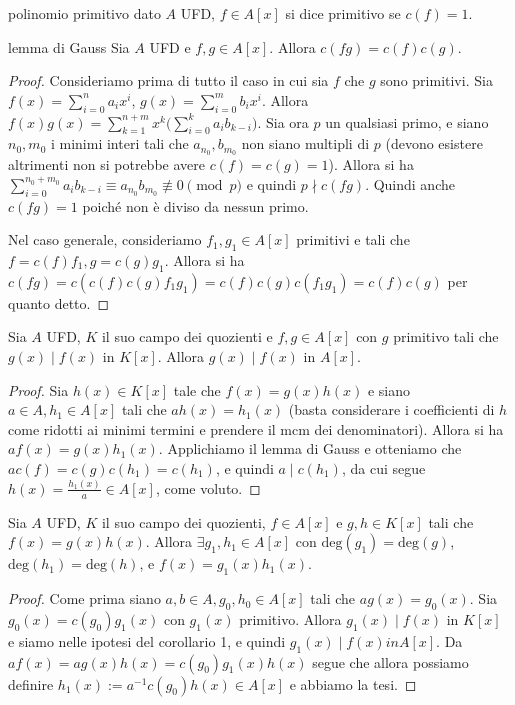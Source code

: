 \begin{definition}{polinomio primitivo}
    dato $A$ UFD, $f  \in A[x]$ si dice primitivo se $c(f) = 1$.
\end{definition}
\begin{theorem}{lemma di Gauss}
    Sia $A$ UFD e $f,g \in A[x]$. Allora $c(fg) = c(f)c(g)$.
\end{theorem}
\begin{proof}
    Consideriamo prima di tutto il caso in cui sia $f$ che $g$ sono primitivi. Sia $f(x) = \sum_{i=0}^n a_i x^i$, $g(x) = \sum_{i=0}^m b_ix^i$. Allora $f(x)g(x) = \sum_{k=1}^{n+m} x^k\big( \sum_{i = 0}^k a_ib_{k-i} \big)$. Sia ora $p$ un qualsiasi primo, e siano $n_0,m_0$ i minimi interi tali che $a_{n_0}, b_{m_0}$ non siano multipli di $p$ (devono esistere altrimenti non si potrebbe avere $c(f)= c(g) = 1$). Allora si ha $\sum_{i = 0}^{n_0+m_0} a_ib_{k-i} \equiv a_{n_0}b_{m_0} \not \equiv 0 \pmod{p}$ e quindi $p \nmid c(fg)$. Quindi anche $c(fg)=1$ poiché non è diviso da nessun primo.
    
    Nel caso generale, consideriamo $f_1, g_1 \in A[x]$ primitivi e tali che $f = c(f)f_1, g = c(g)g_1$. Allora si ha $c(fg) = c(c(f)c(g)f_1g_1) = c(f)c(g)c(f_1g_1) = c(f)c(g)$ per quanto detto.
\end{proof}
\begin{corollary}{1}
    Sia $A$ UFD, $K$ il suo campo dei quozienti e $f,g \in A[x]$ con $g$ primitivo tali che $g(x) \mid f(x)$ in $K[x]$. Allora $g(x) \mid f(x)$ in $A[x]$.
\end{corollary}
\begin{proof}
    Sia $h(x) \in K[x]$ tale che $f(x) = g(x)h(x)$ e siano $a \in A, h_1 \in A[x]$ tali che $ah(x) = h_1(x)$ (basta considerare i coefficienti di $h$ come ridotti ai minimi termini e prendere il mcm dei denominatori). Allora si ha $af(x) = g(x)h_1(x)$. Applichiamo il lemma di Gauss e otteniamo che $ac(f) = c(g)c(h_1) = c(h_1)$, e quindi $a \mid c(h_1)$, da cui segue $h(x) = \frac{h_1(x)}{a} \in A[x]$, come voluto.
\end{proof}
\begin{corollary}{2}
    Sia $A$ UFD, $K$ il suo campo dei quozienti, $f \in A[x]$ e $g,h \in K[x]$ tali che $f(x) = g(x)h(x)$. Allora $\exists g_1, h_1 \in A[x]$ con $\text{deg}(g_1) = \text{deg}(g)$, $\text{deg}(h_1) = \text{deg}(h)$, e $f(x) = g_1(x)h_1(x)$.
\end{corollary}
\begin{proof}
    Come prima siano $a,b\in A, g_0,h_0 \in A[x]$ tali che $ag(x) = g_0(x)$. Sia $g_0(x) = c(g_0)g_1(x)$ con $g_1(x)$ primitivo. Allora $g_1(x) \mid f(x)$  in $K[x]$ e siamo nelle ipotesi del corollario 1, e quindi $g_1(x) \mid f(x)  in A[x]$. Da $af(x) = ag(x)h(x) = c(g_0)g_1(x)h(x)$ segue che allora possiamo definire $h_1(x) := a^{-1}c(g_0)h(x) \in A[x]$ e abbiamo la tesi.
\end{proof}
